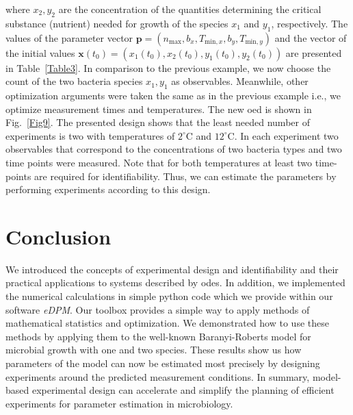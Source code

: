 \documentclass[graybox]{svmult}
\newcommand{\mbx}{\mathbf{x}}
\newcommand{\mbp}{\mathbf{p}}
\begin{document}
where $x_2, y_2$ are the concentration of the quantities determining the critical substance (nutrient) needed for growth of the species $x_1$ and $y_1$, respectively.
The values of the parameter vector $\mbp = (n_\text{max}, b_x, T_{\text{min}, x}, b_y, T_{\text{min}, y})$ and the vector of the initial values $\mbx(t_0)=(x_1(t_0), x_2(t_0), y_1(t_0), y_2(t_0))$ are presented in Table~\ref{Table3}.
%
In comparison to the previous example, we now choose the count of the two bacteria species $x_1,y_1$ as observables.
Meanwhile, other optimization arguments were taken the same as in the previous example i.e., we optimize measurement times and temperatures.
The new \ac{oed} is shown in Fig.~\ref{Fig9}.
%
%
The presented design shows that the least needed number of experiments is two with temperatures of $2^\circ$C and $12^\circ$C.
In each experiment two observables that correspond to the concentrations of two bacteria types and two time points were measured.
Note that for both temperatures at least two time-points are required for identifiability.
Thus, we can estimate the parameters by performing experiments according to this design.
%
%
%
\section{Conclusion}
We introduced the concepts of experimental design and identifiability and their practical applications to systems described by \acp{ode}.
In addition, we implemented the numerical calculations in simple python code which we provide within our software {\it eDPM}.
Our toolbox provides a simple way to apply methods of mathematical statistics and optimization.
We demonstrated how to use these methods by applying them to the well-known Baranyi-Roberts model for microbial growth with one and two species.
These results show us how parameters of the model can now be estimated most precisely by designing experiments around the predicted measurement conditions.
In summary, model-based experimental design can accelerate and simplify the planning of efficient experiments for parameter estimation in microbiology.
%
%
%
\end{document}
